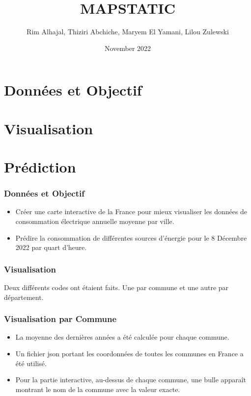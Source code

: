 \documentclass{beamer}
\title[Développement Logiciel]{MAPSTATIC}
\author[]{Rim Alhajal, Thiziri Abchiche, Maryem El Yamani, Lilou Zulewski}
\institute[M1 - SSD]{M1 - SSD}
\date{November 2022}
\begin{document}
\maketitle

\section{Données et Objectif}

\section{Visualisation}

\section{Prédiction}

\begin{frame}
\frametitle{Données et Objectif}
\begin{itemize}
    \item Créer une carte interactive de la France pour mieux visualiser les données de consommation électrique annuelle moyenne par ville.\\
    \item Prédire la consommation de différentes sources d'énergie pour le 8 Décembre 2022 par quart d'heure.
\end{itemize}
\end{frame}

\begin{frame}
\frametitle{Visualisation}
Deux différents codes ont étaient faits. Une par commune et une autre par département.\\
\end{frame}

\begin{frame}
\frametitle{Visualisation par Commune}
\begin{itemize}
    \item La moyenne des dernières années a été calculée pour chaque commune.\\
    \item Un fichier json portant les coordonnées de toutes les communes en France a été utilisé.
    \item Pour la partie interactive, au-dessus de chaque commune, une bulle apparaît montrant le nom de la commune avec la valeur exacte.
\end{itemize}
\end{frame}
\end{document}
